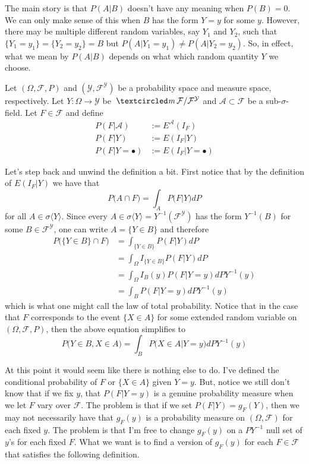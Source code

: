 The main story is that $P(A|B)$ doesn't have any meaning when $P(B)=0$. We can only make sense of this when $B$ has the form $Y=y$ for some $y$. However, there may be multiple different random variables, say $Y_1$ and $Y_2$, such that $\{Y_1 = y_1\} = \{Y_2 = y_2\} =  B$ but $P(A|Y_1 = y_1)\neq P(A|Y_2 = y_2)$. So, in effect, what we mean by $P(A|B)$ depends on what which random quantity $Y$ we choose.

\begin{definition}
Let $(\Omega, \mathcal F, P)$  and $(\mathcal Y, \mathcal F^{\mathcal Y})$ be a probability space and measure space, respectively. Let $Y:\Omega \rightarrow \mathcal Y$ be $\mcirc \mathcal F/ \mathcal F^{\mathcal Y}$ and $\mathcal A\subset \mathcal F$ be a sub-$\sigma$-field. Let $F\in \mathcal F$ and define
\begin{align*}
P(F|\mathcal A)&:= E^{\mathcal A}(I_F) \\
P(F|Y)&:= E(I_F |Y)\\
P(F|Y=\bullet)&:= E(I_F |Y=\bullet)
\end{align*}
\end{definition}


Let's step back and unwind the definition a bit. First notice that by the definition of $E(I_F|Y)$ we have that
\[P\bigl(A\cap F\bigr) = \int_A P\bigl(F | Y \bigr) dP \]
for all $A\in \sigma \langle Y\rangle $. Since every $A\in\sigma \langle Y\rangle = Y^{-1}(\mathcal F^{\mathcal Y})$ has the form $Y^{-1}(B)$ for some $B\in  \mathcal F^{\mathcal Y}$,  one can write $A = \{Y\in B \}$ and  therefore
\begin{align*}
P\bigl( \{Y\in B \}\cap F\bigr)
& = \int_{\{Y\in B \} } P(F | Y ) dP \\
&= \int_{\Omega} I_{\{Y\in B \} } P(F | Y ) dP  \\
&= \int_{\Omega} I_{B}(y) P(F | Y= y ) dPY^{-1} (y) \\
&= \int_{B} P(F | Y= y ) dPY^{-1} (y)
\end{align*}
which is what one might call the law of total probability.
Notice that in the case that $F$ corresponds to the event $\{X\in A \}$ for some extended random variable on $(\Omega, \mathcal F, P)$, then the above equation simplifies to
\[
P\bigl(Y \in B , X\in A \bigr)
= \int_{B} P\bigl(X\in A | Y= y \bigr) dPY^{-1} (y)
\]

At this point it would seem like there is nothing else to do. I've defined the conditional probability of $F$ or $\{ X\in A \}$ given $Y = y$. But, notice we still don't know that if we fix $y$, that $P(F|Y=y)$ is a genuine probability measure when we let $F$ vary over $\mathcal F$. The problem is that if we set $P(F |Y)= g_F(Y)$, then we may not necessarily have that $g_F(y)$ is a probability measure on $(\Omega, \mathcal F)$ for each fixed $y$. The problem is that I'm free to change $g_F(y)$ on a $PY^{-1}$ null set of $y$'s for each fixed $F$. What we want is to find a version of $g_F(y)$ for each $F\in\mathcal F$ that satisfies the following definition.

